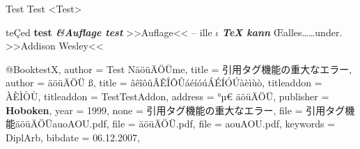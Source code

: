 Test
Test
<Test>

te\c Ced \textbf{test \it &Auflage test} >>Auf\/lage<< -- ille \"{$\iota$} \emph{\bf \TeX{} kann} {\OE}alles\ldots \ldots \frq{}under\flq{}. >>Ad{d\-i}son We{s\-l}ey<<

@Book{testX,
author = {Test N{\"a}{\"o}{\"u}{\"A}{\"O}{\"U}me},
title = {{引用タグ機能の重大なエラー}},
author = {\"a}{\"o}{\"u}{\"A}{\"O}{\"U} {\ss},
title = {{{\^a}{\^e}{\^i}{\^o}{\^u}{\^A}{\^E}{\^I}{\^O}{\^U}{\'a}{\'e}{\'i}{\'o}{\'u}{\'A}{\'E}{\'I}{\'O}{\'U}{\`a}{\`e}{\`i}{\`u}{\`o}}},
titleaddon = {{{\`A}{\`E}{\`I}{\`O}{\`U}}},
titleaddon = {{TestTestAddon}},
address = {°µ€ {\"a}{\"o}{\"u}{\"A}{\"O}{\"U}},
publisher = {\textbf{Hoboken}},
year = 1999,
none = {引用タグ機能の重大なエラー},
file = {引用タグ機能{\"a}{\"o}{\"u}{\"A}{\"O}{\"U}auoAOU.pdf},
file = {{\"a}{\"o}{\"u}{\"A}{\"O}{\"U}.pdf},
file = {aouAOU.pdf},
keywords = {DiplArb},
bibdate = {06.12.2007},
}

